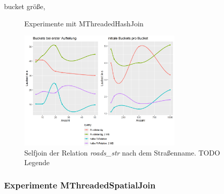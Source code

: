 \documentclass[a4paper,12pt,twoside]{article}
\newcommand{\Fb}[1]{\textit{#1}} %
\begin{document}
bucket größe, 

\begin{figure}
	\centering
	\qquad	
	\caption{Experimente mit MThreadedHashJoin}
	\label{img:joinExpAllg}
\end{figure}


\begin{figure}
	\centering
	\includegraphics[width=0.70\textwidth]{Bilder/join_bucket.png}
	\caption{Selfjoin der Relation \Fb{roads\_str} nach dem Straßenname. TODO Legende}
	\label{img:joinBucket}
\end{figure}

\subsubsection{Experimente MThreadedSpatialJoin}
\end{document}
